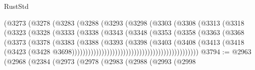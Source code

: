 \begin{lexlean}{RustStd}
\begin{coremodule}
                                  (@3273
                                    (@3278
                                      (@3283
                                        (@3288
                                          (@3293
                                            (@3298
                                              (@3303
                                                (@3308
                                                  (@3313
                                                    (@3318
                                                      (@3323
                                                        (@3328
                                                          (@3333
                                                            (@3338
                                                              (@3343
                                                                (@3348
                                                                  (@3353
                                                                    (@3358
                                                                      (@3363
                                                                        (@3368
                                                                          (@3373
                                                                            (@3378
                                                                              (@3383
                                                                                (@3388
                                                                                  (@3393
                                                                                    (@3398
                                                                                      (@3403
                                                                                        (@3408
                                                                                          (@3413
                                                                                            (@3418
                                                                                              (@3423
                                                                                                (@3428
                                                                                                  @3698)))))))))))))))))))))))))))))))))))))))))))))))
@3794 := @2963
    (@2968
      (@2384
        (@2973
          (@2978
            (@2983
              (@2988
                (@2993
                  (@2998

\end{coremodule}
\end{lexlean}
